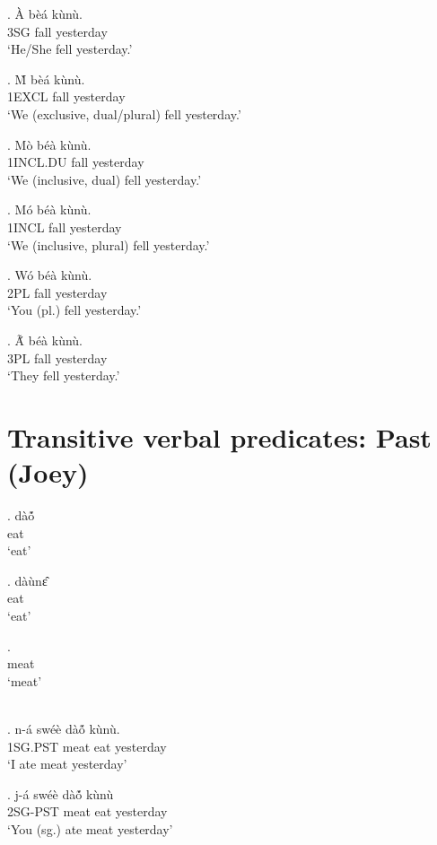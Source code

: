 \documentclass{assets/fieldnotes}
\begin{document}
{\exg. \`{A} b\`{e}\'{a} k\`{u}n\`{u}. \\
3SG fall yesterday \\
`He/She fell yesterday.'

\exg. \`{M} b\`{e}\'{a} k\`{u}n\`{u}. \\
1EXCL fall yesterday \\
`We (exclusive, dual/plural) fell yesterday.'

\exg. M\`{o} b\'{e}\`{a} k\`{u}n\`{u}. \\
1INCL.DU fall yesterday \\
`We (inclusive, dual) fell yesterday.'

\exg. M\'{o} b\'{e}\`{a} k\`{u}n\`{u}. \\
1INCL fall yesterday \\
`We (inclusive, plural) fell yesterday.'

\exg. W\'{o} b\'{e}\`{a} k\`{u}n\`{u}. \\
2PL fall yesterday \\
`You (pl.) fell yesterday.'

\exg. Ã́ b\'{e}\`{a} k\`{u}n\`{u}. \\
3PL fall yesterday \\
`They fell yesterday.' 

\section{Transitive verbal predicates: Past (Joey)} 

\exg. dàó̃\\
    eat\\
    `eat'

\exg. dàùnɛ̂\\
    eat\\
    `eat'


\exg.  \\
meat\\
`meat'
  

\\

\exg. n-á swéè dàó̃ kùnù.\\
1SG.PST meat eat yesterday \\%
    `I ate meat yesterday'

\exg. j-á swéè dàó̃ kùnù\\
2SG-PST meat eat yesterday \\%
    `You (sg.) ate meat yesterday'

}
\end{document}

